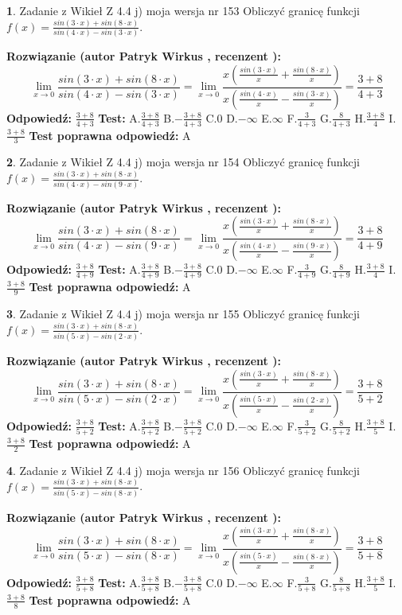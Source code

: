 \documentclass[12pt, a4paper]{article}
\theoremstyle{definition} %
\newtheorem{zad}{}
\newcommand{\zadStart}[1]{\begin{zad}#1\newline}
\newcommand{\zadStop}{\end{zad}}
\newcommand{\rozwStart}[2]{\noindent \textbf{Rozwiązanie (autor #1 , recenzent #2): }\newline}
\newcommand{\rozwStop}{\newline}
\newcommand{\odpStart}{\noindent \textbf{Odpowiedź:}\newline}
\newcommand{\odpStop}{\newline}
\newcommand{\testStart}{\noindent \textbf{Test:}\newline}
\newcommand{\testStop}{\newline}
\newcommand{\kluczStart}{\noindent \textbf{Test poprawna odpowiedź:}\newline}
\newcommand{\kluczStop}{\newline}
\begin{document}
\zadStart{Zadanie z Wikieł Z 4.4 j) moja wersja nr 153}
Obliczyć granicę funkcji $f(x)=\frac{sin(3\cdot x) +sin(8\cdot x)}{sin(4\cdot x) -sin(3\cdot x)}$.
\zadStop
\rozwStart{Patryk Wirkus}{}
$$\lim\limits_{x\to 0}\frac{sin(3\cdot x) +sin(8\cdot x)}{sin(4\cdot x) -sin(3\cdot x)}=\lim\limits_{x\to 0}\frac{x(\frac{sin(3\cdot x)}{x}+\frac{sin(8\cdot x)}{x})}{x(\frac{sin(4\cdot x)}{x}-\frac{sin(3\cdot x)}{x})}=\frac{3+8}{4+3}$$
\rozwStop
\odpStart
$\frac{3+8}{4+3}$
\odpStop
\testStart
A.$\frac{3+8}{4+3}$
B.$-\frac{3+8}{4+3}$
C.$0$
D.$-\infty$
E.$\infty$
F.$\frac{3}{4+3}$
G.$\frac{8}{4+3}$
H.$\frac{3+8}{4}$
I.$\frac{3+8}{3}$
\testStop
\kluczStart
A
\kluczStop



\zadStart{Zadanie z Wikieł Z 4.4 j) moja wersja nr 154}
Obliczyć granicę funkcji $f(x)=\frac{sin(3\cdot x) +sin(8\cdot x)}{sin(4\cdot x) -sin(9\cdot x)}$.
\zadStop
\rozwStart{Patryk Wirkus}{}
$$\lim\limits_{x\to 0}\frac{sin(3\cdot x) +sin(8\cdot x)}{sin(4\cdot x) -sin(9\cdot x)}=\lim\limits_{x\to 0}\frac{x(\frac{sin(3\cdot x)}{x}+\frac{sin(8\cdot x)}{x})}{x(\frac{sin(4\cdot x)}{x}-\frac{sin(9\cdot x)}{x})}=\frac{3+8}{4+9}$$
\rozwStop
\odpStart
$\frac{3+8}{4+9}$
\odpStop
\testStart
A.$\frac{3+8}{4+9}$
B.$-\frac{3+8}{4+9}$
C.$0$
D.$-\infty$
E.$\infty$
F.$\frac{3}{4+9}$
G.$\frac{8}{4+9}$
H.$\frac{3+8}{4}$
I.$\frac{3+8}{9}$
\testStop
\kluczStart
A
\kluczStop



\zadStart{Zadanie z Wikieł Z 4.4 j) moja wersja nr 155}
Obliczyć granicę funkcji $f(x)=\frac{sin(3\cdot x) +sin(8\cdot x)}{sin(5\cdot x) -sin(2\cdot x)}$.
\zadStop
\rozwStart{Patryk Wirkus}{}
$$\lim\limits_{x\to 0}\frac{sin(3\cdot x) +sin(8\cdot x)}{sin(5\cdot x) -sin(2\cdot x)}=\lim\limits_{x\to 0}\frac{x(\frac{sin(3\cdot x)}{x}+\frac{sin(8\cdot x)}{x})}{x(\frac{sin(5\cdot x)}{x}-\frac{sin(2\cdot x)}{x})}=\frac{3+8}{5+2}$$
\rozwStop
\odpStart
$\frac{3+8}{5+2}$
\odpStop
\testStart
A.$\frac{3+8}{5+2}$
B.$-\frac{3+8}{5+2}$
C.$0$
D.$-\infty$
E.$\infty$
F.$\frac{3}{5+2}$
G.$\frac{8}{5+2}$
H.$\frac{3+8}{5}$
I.$\frac{3+8}{2}$
\testStop
\kluczStart
A
\kluczStop



\zadStart{Zadanie z Wikieł Z 4.4 j) moja wersja nr 156}
Obliczyć granicę funkcji $f(x)=\frac{sin(3\cdot x) +sin(8\cdot x)}{sin(5\cdot x) -sin(8\cdot x)}$.
\zadStop
\rozwStart{Patryk Wirkus}{}
$$\lim\limits_{x\to 0}\frac{sin(3\cdot x) +sin(8\cdot x)}{sin(5\cdot x) -sin(8\cdot x)}=\lim\limits_{x\to 0}\frac{x(\frac{sin(3\cdot x)}{x}+\frac{sin(8\cdot x)}{x})}{x(\frac{sin(5\cdot x)}{x}-\frac{sin(8\cdot x)}{x})}=\frac{3+8}{5+8}$$
\rozwStop
\odpStart
$\frac{3+8}{5+8}$
\odpStop
\testStart
A.$\frac{3+8}{5+8}$
B.$-\frac{3+8}{5+8}$
C.$0$
D.$-\infty$
E.$\infty$
F.$\frac{3}{5+8}$
G.$\frac{8}{5+8}$
H.$\frac{3+8}{5}$
I.$\frac{3+8}{8}$
\testStop
\kluczStart
A
\kluczStop
\end{document}
